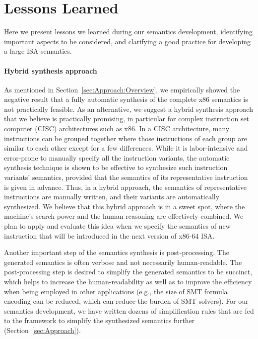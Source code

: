 \section{Lessons Learned}
\label{sec:lesson-learned}

{\color{blue}

Here we present lessons we learned during our semantics development, identifying important aspects to be considered, and clarifying a good practice for developing a large ISA semantics.

\paragraph{Hybrid synthesis approach}

As mentioned in Section~\ref{sec:Approach:Overview}, we empirically showed the negative result that a fully automatic synthesis of the complete x86 semantics is not practically feasible. As an alternative, we suggest a hybrid synthesis approach that we believe is practically promising, in particular for complex instruction set computer (CISC) architectures such as x86. In a CISC architecture, many instructions can be grouped together where those instructions of each group are similar to each other except for a few differences. While it is labor-intensive and error-prone to manually specify all the instruction variants, the automatic synthesis technique is shown to be effective to synthesize such instruction variants' semantics, provided that the semantics of its representative instruction is given in advance. Thus, in a hybrid approach, the semantics of representative instructions are manually written, and their variants are automatically synthesized. We believe that this hybrid approach is in a sweet spot, where the machine's search power and the human reasoning are effectively combined. We plan to apply and evaluate this idea when we specify the semantics of new instruction that will be introduced in the next version of x86-64 ISA.

Another important step of the semantics synthesis is post-processing. The generated semantics is often verbose and not necessarily human-readable. The post-processing step is desired to simplify the generated semantics to be succinct, which helps to increase the human-readability as well as to improve the efficiency when being employed in other applications (e.g., the size of SMT formula encoding can be reduced, which can reduce the burden of SMT solvers). For our semantics development, we have written dozens of simplification rules that are fed to the \K framework to simplify the synthesized semantics further (Section~\ref{sec:Approach}).

}

